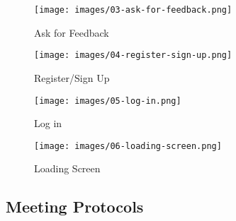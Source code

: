 \documentclass[a4paper, 12pt]{article}
\begin{document}
\begin{figure} [htbp]
  \begin{center}
    \texttt{[image: images/03-ask-for-feedback.png]}
  \end{center}
  \caption{Ask for Feedback}
\end{figure}

\begin{figure} [htbp]
  \begin{center}
    \texttt{[image: images/04-register-sign-up.png]}
  \end{center}
  \caption{Register/Sign Up}
\end{figure}

\begin{figure} [htbp]
  \begin{center}
    \texttt{[image: images/05-log-in.png]}
  \end{center}
  \caption{Log in}
\end{figure}

\begin{figure} [htbp]
  \begin{center}
    \texttt{[image: images/06-loading-screen.png]}
  \end{center}
  \caption{Loading Screen}
\end{figure}

\newpage
\subsection{Meeting Protocols}
\end{document}
